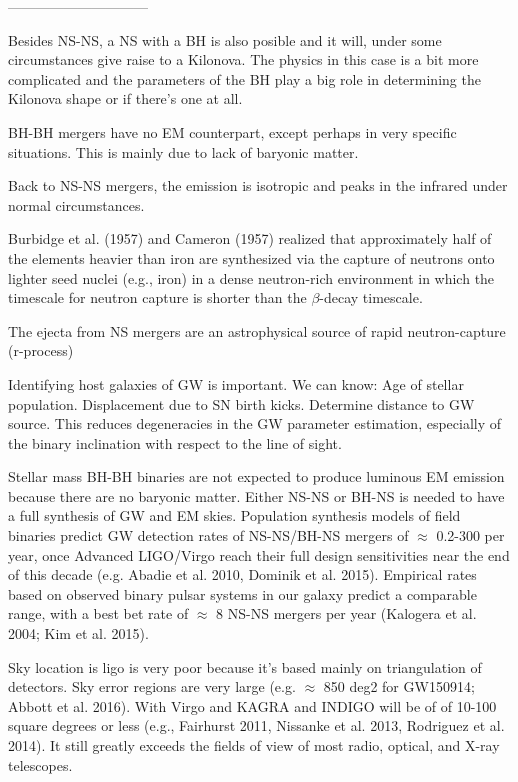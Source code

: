 ------------------------------

Besides NS-NS, a NS with a BH is also posible and it will, under some circumstances give raise to a Kilonova. The physics in this case is a bit more complicated and the parameters of the BH play a big role in determining the Kilonova shape or if there's one at all.

BH-BH mergers have no EM counterpart, except perhaps in very specific situations. This is mainly due to lack of baryonic matter.

Back to NS-NS mergers, the emission is isotropic and peaks in the infrared under normal circumstances.


Burbidge et al. (1957) and Cameron (1957) realized that approximately half of the elements heavier than iron are synthesized via the capture of neutrons onto lighter seed nuclei (e.g., iron) in a dense neutron-rich environment in which the timescale for neutron capture is shorter than the $\beta$-decay timescale.

The ejecta from NS mergers are an astrophysical source of rapid neutron-capture (r-process) 

Identifying host galaxies of GW is important. We can know:
	Age of stellar population.
	Displacement due to SN birth kicks.
	Determine distance to GW source. This reduces degeneracies in the GW parameter estimation, especially of the binary inclination with respect to the line of sight.

Stellar mass BH-BH binaries are not expected to produce luminous EM emission because there are no baryonic matter.
Either NS-NS or BH-NS is needed to have a full synthesis of GW and EM skies.
Population synthesis models of field binaries predict GW detection rates of NS-NS/BH-NS mergers of $\approx$ 0.2-300 per year, once Advanced LIGO/Virgo reach their full design sensitivities near the end of this decade (e.g. Abadie et al. 2010, Dominik et al. 2015).
Empirical rates based on observed binary pulsar systems in our galaxy predict a comparable range, with a best bet rate of $\approx$ 8 NS-NS mergers per year (Kalogera et al. 2004; Kim et al. 2015).

Sky location is ligo is very poor because it's based mainly on triangulation of detectors.
	Sky error regions are very large (e.g. $\approx$ 850 deg2 for GW150914; Abbott et al. 2016).
	With Virgo and KAGRA and INDIGO will be of of 10-100 square degrees or less (e.g., Fairhurst 2011, Nissanke et al. 2013, Rodriguez et al. 2014).
	It still greatly exceeds the fields of view of most radio, optical, and X-ray telescopes.
	
